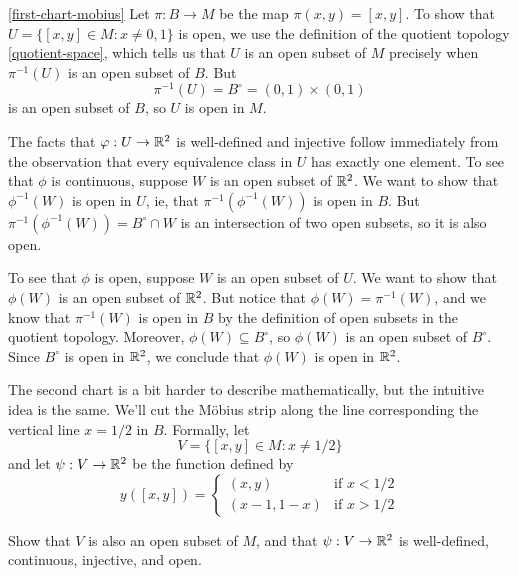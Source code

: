 \begin{solution}{\cref{first-chart-mobius}}
	Let $\pi : B \to M$ be the map $\pi(x,y) = [x,y]$. To show that $U = \{[x,y] \in M : x \neq 0,1\}$ is open, we use the definition of the quotient topology \cref{quotient-space}, which tells us that $U$ is an open subset of $M$ precisely when $\pi^{-1}(U)$ is an open subset of $B$. But \[ \pi^{-1}(U) = B^\circ = (0,1) \times (0,1) \] is an open subset of $B$, so $U$ is open in $M$. 
	
	The facts that $\varphi : U \to \mathbb{R}^2$ is well-defined and injective follow immediately from the observation that every equivalence class in $U$ has exactly one element. To see that $\phi$ is continuous, suppose $W$ is an open subset of $\mathbb{R}^2$. We want to show that $\phi^{-1}(W)$ is open in $U$, ie, that $\pi^{-1}(\phi^{-1}(W))$ is open in $B$. But $\pi^{-1}(\phi^{-1}(W)) = B^\circ \cap W$ is an intersection of two open subsets, so it is also open. 
	
	To see that $\phi$ is open, suppose $W$ is an open subset of $U$. We want to show that $\phi(W)$ is an open subset of  $\mathbb{R}^2$. But notice that $\phi(W) = \pi^{-1}(W)$, and we know that $\pi^{-1}(W)$ is open in $B$ by the definition of open subsets in the quotient topology. Moreover, $\phi(W) \subseteq B^\circ$, so $\phi(W)$ is an open subset of $B^\circ$. Since $B^\circ$ is open in $\mathbb{R}^2$, we conclude that $\phi(W)$ is open in $\mathbb{R}^2$. 
\end{solution}

The second chart is a bit harder to describe mathematically, but the intuitive idea is the same. We'll cut the M\"obius strip along the line corresponding the vertical line $x = 1/2$ in $B$. Formally, let \[ V = \{ [x, y] \in M : x \neq 1/2 \} \] and let $\psi : V \to  \mathbb{R}^2$ be the function defined by 
\[ y([x, y]) = \begin{cases} (x, y) & \text{if } x < 1/2 \\ (x-1, 1-x) & \text{if } x > 1/2 \end{cases} \]

\begin{exercise} \label{second-chart-mobius}
	Show that $V$ is also an open subset of $M$, and that $\psi : V \to \mathbb{R}^2$ is well-defined, continuous, injective, and open. 
\end{exercise}

